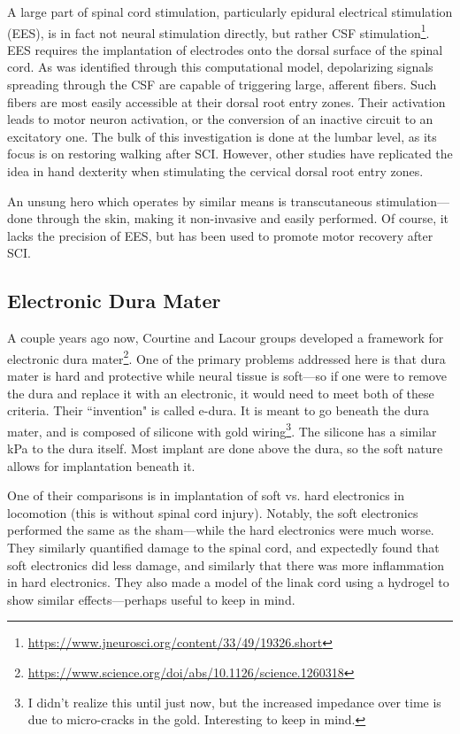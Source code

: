 A large part of spinal cord stimulation, particularly epidural electrical stimulation (EES), is in fact not neural stimulation directly, but rather CSF stimulation\footnote{\url{https://www.jneurosci.org/content/33/49/19326.short}}. EES requires the implantation of electrodes onto the dorsal surface of the spinal cord. As was identified through this computational model, depolarizing signals spreading through the CSF are capable of triggering large, afferent fibers. Such fibers are most easily accessible at their dorsal root entry zones. Their activation leads to motor neuron activation, or the conversion of an inactive circuit to an excitatory one. The bulk of this investigation is done at the lumbar level, as its focus is on restoring walking after SCI. However, other studies have replicated the idea in hand dexterity when stimulating the cervical dorsal root entry zones.\newline

An unsung hero which operates by similar means is transcutaneous stimulation---done through the skin, making it non-invasive and easily performed. Of course, it lacks the precision of EES, but has been used to promote motor recovery after SCI. 


\subsection{Electronic Dura Mater}

A couple years ago now, Courtine and Lacour groups developed a framework for electronic dura mater\footnote{\url{https://www.science.org/doi/abs/10.1126/science.1260318}}. One of the primary problems addressed here is that dura mater is hard and protective while neural tissue is soft---so if one were to remove the dura and replace it with an electronic, it would need to meet both of these criteria. Their ``invention" is called e-dura. It is meant to go beneath the dura mater, and is composed of silicone with gold wiring\footnote{I didn't realize this until just now, but the increased impedance over time is due to micro-cracks in the gold. Interesting to keep in mind.}. The silicone has a similar kPa to the dura itself. Most implant are done above the dura, so the soft nature allows for implantation beneath it.\newline

One of their comparisons is in implantation of soft vs. hard electronics in locomotion (this is without spinal cord injury). Notably, the soft electronics performed the same as the sham---while the hard electronics were much worse. They similarly quantified damage to the spinal cord, and expectedly found that soft electronics did less damage, and similarly that there was more inflammation in hard electronics. They also made a model of the linak cord using a hydrogel to show similar effects---perhaps useful to keep in mind.\newline

